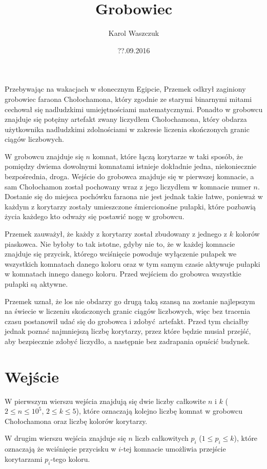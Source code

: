 \documentclass[zad,zawodnik,utf8]{sinol}
\title{Grobowiec}
\author{Karol Waszczuk} %
\date{??.09.2016}
\begin{document}
\begin{tasktext}%

Przebywając na wakacjach w słonecznym Egipcie, Przemek odkrył zaginiony grobowiec faraona Chołochamona, który zgodnie ze starymi binarnymi mitami cechował się nadludzkimi umiejętnościami matematycznymi. Ponadto w grobowcu znajduje się potężny artefakt zwany liczydłem Chołochamona, który obdarza użytkownika nadludzkimi zdolnościami w zakresie liczenia skończonych granic ciągów liczbowych.

W grobowcu znajduje się $n$ komnat, które łączą korytarze w taki sposób, że pomiędzy dwiema dowolnymi komnatami istnieje dokładnie jedna, niekoniecznie bezpośrednia, droga. Wejście do grobowca znajduje się w pierwszej komnacie, a sam Chołochamon został pochowany wraz z jego liczydłem w komnacie numer $n$. Dostanie się do miejsca pochówku faraona nie jest jednak takie łatwe, ponieważ w każdym z korytarzy zostały umieszczone śmiercionośne pułapki, które pozbawią życia każdego kto odważy się postawić nogę w grobowcu.

Przemek zauważył, że każdy z korytarzy został zbudowany z jednego z $k$ kolorów piaskowca. Nie byłoby to tak istotne, gdyby nie to, że w każdej komnacie znajduje się przycisk, którego wciśnięcie powoduje wyłączenie pułapek we wszystkich komnatach danego koloru oraz w tym samym czasie aktywuje pułapki w komnatach innego danego koloru. Przed wejściem do grobowca wszystkie pułapki są aktywne.

Przemek uznał, że los nie obdarzy go drugą taką szansą na zostanie najlepszym na świecie w liczeniu skończonych granic ciągów liczbowych, więc bez tracenia czasu postanowił udać się do grobowca i zdobyć artefakt. Przed tym chciałby jednak poznać najmniejszą liczbę korytarzy, przez które będzie musiał przejść, aby bezpiecznie zdobyć liczydło, a następnie bez zadrapania opuścić budynek. 

  \section{Wejście}
W pierwszym wierszu wejścia znajdują się dwie liczby całkowite $n$ i $k$ ($2 \leq n \leq 10^5$, $2 \leq k \leq 5$), które oznaczają kolejno liczbę komnat w grobowcu Chołochamona oraz liczbę kolorów korytarzy.

W drugim wierszu wejścia znajduje się $n$ liczb całkowitych $p_i$ ($1 \leq p_i \leq k$), które oznaczają że wciśnięcie przycisku w $i$-tej komnacie umożliwia przejście korytarzami $p_i$-tego koloru.


\end{tasktext}
\end{document}

